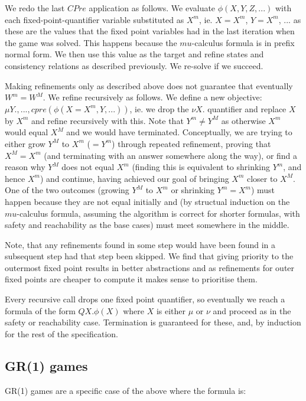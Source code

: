 \documentclass[a4paper,twoside,openright,11pt]{book}
\theoremstyle{definition}
\begin{document}
We redo the last $CPre$ application as follows. We evaluate $\phi(X, Y, Z, ...)$ with each fixed-point-quantifier variable substituted as $X^m$, ie. $X=X^m$, $Y=X^m$, ... as these are the values that the fixed point variables had in the last iteration when the game was solved. This happens because the $mu$-calculus formula is in prefix normal form. We then use this value as the target and refine states and consistency relations as described previously. We re-solve if we succeed.

Making refinements only as described above does not guarantee that eventually $W^m = W^M$. We refine recursively as follows. We define a new objective: $\mu Y., ..., cpre(\phi(X=X^m, Y, ...))$, ie. we drop the $\nu X.$ quantifier and replace $X$ by $X^m$ and refine recursively with this. Note that $Y^m \neq Y^M$ as otherwise $X^m$ would equal $X^M$ and we would have terminated. Conceptually, we are trying to either grow $Y^M$ to $X^m$ ($=Y^m$) through repeated refinement, proving that $X^M = X^m$ (and terminating with an answer somewhere along the way), or find a reason why $Y^M$ does not equal $X^m$ (finding this is equivalent to shrinking $Y^m$, and hence $X^m$) and continue, having achieved our goal of bringing $X^m$ closer to $X^M$. One of the two outcomes (growing $Y^M$ to $X^m$ or shrinking $Y^m = X^m$) must happen because they are not equal initially and (by structual induction on the $mu$-calculus formula, assuming the algorithm is correct for shorter formulas, with safety and reachability as the base cases) must meet somewhere in the middle.

Note, that any refinements found in some step would have been found in a subsequent step had that step been skipped. We find that giving priority to the outermost fixed point results in better abstractions and as refinements for outer fixed points are cheaper to compute it makes sense to prioritise them.

Every recursive call drops one fixed point quantifier, so eventually we reach a formula of the form $Q X. \phi(X)$ where $X$ is either $\mu$ or $\nu$ and proceed as in the safety or reachability case. Termination is guaranteed for these, and, by induction for the rest of the specification.

\subsection{GR(1) games}

GR(1) games are a specific case of the above where the formula is:
\end{document}
